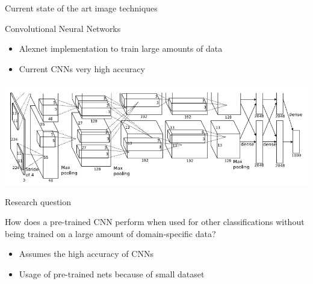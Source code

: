 \documentclass{beamer}
\begin{document}
    \begin{frame}{Current state of the art image techniques}
        \begin{block}{Convolutional Neural Networks}
            \begin{itemize}
            \item Alexnet implementation to train large amounts of data \cite{alexnet}
            \item Current CNNs very high accuracy \cite{cnn}
            \end{itemize}
        \end{block}
        \includegraphics[width=\textwidth]{images/alexnet2012.png}
    \end{frame}
    \begin{frame}{Research question}
        \begin{block}{How does a pre-trained CNN perform when used for other classifications without being trained on a large amount of domain-specific data?}
            \begin{itemize}
            \item Assumes the high accuracy of CNNs
            \item Usage of pre-trained nets because of small dataset
            \end{itemize}
        \end{block}
    \end{frame}
\end{document}
